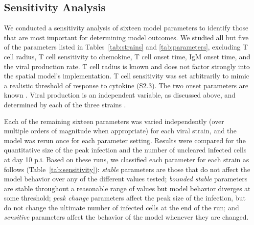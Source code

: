 \documentclass[10pt]{article}
\begin{document}
\subsection*{Sensitivity Analysis}


We conducted a sensitivity analysis of sixteen model parameters to identify those that are most important for determining model outcomes.  We studied all but five of the parameters listed in Tables~\ref{tab:strains} and \ref{tab:parameters}, excluding T cell radius, T cell sensitivity to chemokine, T cell onset time, IgM onset time, and the viral production rate.  T cell radius is known \cite{abbas2011cellular} and does not factor strongly into the spatial model's implementation.  T cell sensitivity was set arbitrarily to mimic a realistic threshold of response to cytokine (S2.3).  The two onset parameters are known \cite{Diamond2003}.  Viral production is an independent variable, as discussed above, and determined by each of the three strains \cite{Mitchell2011}.

Each of the remaining sixteen parameters was varied independently (over multiple orders of magnitude when appropriate) for each viral strain, and the model was rerun once for each parameter setting.  Results were compared for the quantitative size of the peak infection and the number of uncleared infected cells at day 10 p.i.  Based on these runs, we classified each parameter for each strain as follows (Table~\ref{tab:sensitivity}): \textit{stable} parameters are those that do not affect the model behavior over any of the different values tested; \textit{bounded stable} parameters are stable throughout a reasonable range of values but model behavior diverges at some threshold; \textit{peak change} parameters affect the peak size of the infection, but do not change the ultimate number of infected cells at the end of the run; and \textit{sensitive} parameters affect the behavior of the model whenever they are changed.
\end{document}
